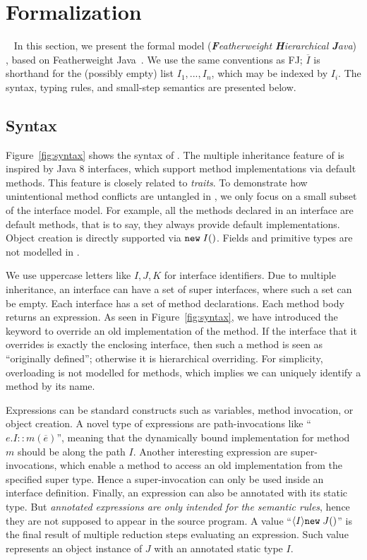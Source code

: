 \section{Formalization}~\label{sec:formalization}
In this section, we present the formal model \MIM{} (\emph{\textbf{F}eatherweight \textbf{H}ierarchical \textbf{J}ava}) , based on
Featherweight Java~\cite{Igarashi01FJ}. We use the same
conventions as FJ; $\overline{I}$ is shorthand for the (possibly empty)
list $I_1, ..., I_n$, which may be indexed by $I_i$.
The syntax, typing rules, and small-step semantics are presented below.

\subsection{Syntax}
Figure~\ref{fig:syntax} shows the syntax of \MIM{}. The multiple
inheritance feature of \MIM{} is inspired by Java 8 interfaces, which support
method implementations via default methods. This feature is 
closely related to \emph{traits}. To demonstrate how
unintentional method conflicts are untangled in \MIM{}, we only focus on a small
subset of the interface model. For example, all the methods declared
in an interface are default methods, that is to say, they always
provide default implementations. 
Object creation is directly supported via $\texttt{new} \; I()$. 
Fields and primitive types are not modelled in \MIM{}.

We use uppercase letters like $I, J, K$ for interface identifiers. 
Due to multiple inheritance, an interface can have a set of
super interfaces, where such a set can be empty. Each interface
has a set of method declarations. Each method body returns
an expression. As seen in Figure~\ref{fig:syntax}, we have introduced the
\kwoverride{} keyword to override an old implementation of the
method. If the interface that it overrides is exactly the enclosing
interface, then such a method is seen as ``originally defined''; otherwise
it is hierarchical overriding.
For simplicity, overloading is not modelled for methods, which
implies we can uniquely identify a method by its name.

Expressions can be standard constructs such as variables, method
invocation, or object creation. A novel type of expressions are path-invocations like
``$e.I::m(\overline{e})$'', meaning that the dynamically bound
implementation for method $m$ should be along the path $I$. Another
interesting expression are super-invocations, which enable a method to access an old
implementation from the specified super type. Hence a super-invocation
can only be used inside an interface definition.
Finally, an expression can also be annotated with its static type. But \emph{annotated expressions are only intended for the semantic rules},
hence they are not supposed to appear in the source program. A value
``$\langle I \rangle\texttt{new} \; J()$''
is the final result of multiple reduction steps evaluating an
expression. Such value represents an object instance
of $J$ with an annotated static type $I$.

